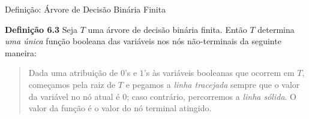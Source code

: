 \expandafter\documentclass\expandafter[table, usenames, svgnames, dvipsnames,14pt, \classopts]{beamer}
\begin{document}
\begin{frame}{Definição: Árvore de Decisão Binária Finita}

    \begin{block}{\textbf{Definição 6.3}}
        Seja $T$ uma árvore de decisão binária finita. Então $T$ determina \textit{uma única} função booleana das variáveis nos nós não-terminais da seguinte maneira:
        
        \begin{quotation}
        \noindent\small\justifying
        Dada uma atribuição de $0$'s e $1$'s às variáveis booleanas que ocorrem em $T$, começamos pela raiz de $T$ e pegamos a \textit{linha tracejada} sempre que o valor da variável no nó atual é $0$; caso contrário, percorremos a \textit{linha sólida}. O valor da função é o valor do nó terminal atingido.
        \end{quotation}
    \end{block}

\end{frame}
\end{document}
